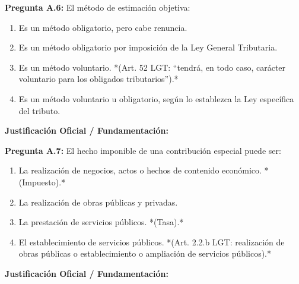 \documentclass[11pt,a4paper,openany]{article}
\begin{document}
\noindent\textbf{\sffamily Pregunta A.6:} El método de estimación objetiva:\\[0.15cm]
\begin{enumerate}[label=\textbf{\alph*)},leftmargin=1.8em,itemsep=1.5pt,topsep=2pt,partopsep=0pt,parsep=0pt]
    \item Es un método obligatorio, pero cabe renuncia.
    \item Es un método obligatorio por imposición de la Ley General Tributaria.
    \item Es un método voluntario. *(Art. 52 LGT: ``tendrá, en todo caso, carácter voluntario para los obligados tributarios'').*
    \item Es un método voluntario u obligatorio, según lo establezca la Ley específica del tributo.
\end{enumerate}
\begin{solucionBox}
\textbf{Justificación Oficial / Fundamentación:}\\[0.1cm]

\end{solucionBox}
\vspace{0.35cm}

\noindent\textbf{\sffamily Pregunta A.7:} El hecho imponible de una contribución especial puede ser:\\[0.15cm]
\begin{enumerate}[label=\textbf{\alph*)},leftmargin=1.8em,itemsep=1.5pt,topsep=2pt,partopsep=0pt,parsep=0pt]
    \item La realización de negocios, actos o hechos de contenido económico. *(Impuesto).*
    \item La realización de obras públicas y privadas.
    \item La prestación de servicios públicos. *(Tasa).*
    \item El establecimiento de servicios públicos. *(Art. 2.2.b LGT: realización de obras públicas o establecimiento o ampliación de servicios públicos).*
\end{enumerate}
\begin{solucionBox}
\textbf{Justificación Oficial / Fundamentación:}\\[0.1cm]

\end{solucionBox}
\vspace{0.35cm}
\end{document}
